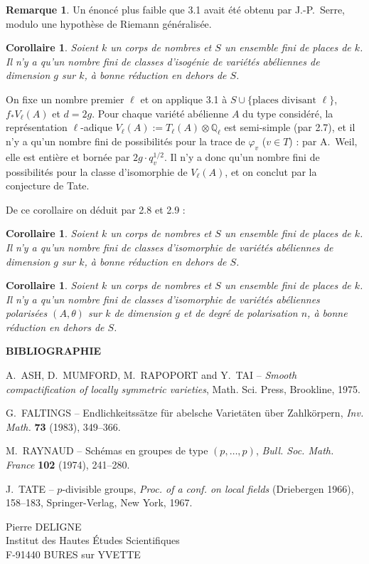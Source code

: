 \documentclass[12pt,a4paper]{article}
\theoremstyle{plain}
\newtheorem{corollary}[theorem]{Corollaire}
\theoremstyle{definition}
\newtheorem{remark}[theorem]{Remarque}
\theoremstyle{remark}
\newcommand{\QQ}{\mathbb{Q}}
\providecommand{\QQ}{\mathbb{Q}}
\begin{document}
\begin{remark}
Un énoncé plus faible que 3.1 avait été obtenu par J.-P.~Serre, modulo une hypothèse de Riemann généralisée.
\end{remark}

\begin{corollary}
Soient $k$ un corps de nombres et $S$ un ensemble fini de places de $k$. Il n'y a qu'un nombre fini de classes d'isogénie de variétés abéliennes de dimension $g$ sur $k$, à bonne réduction en dehors de $S$.
\end{corollary}

On fixe un nombre premier $\ell$ et on applique 3.1 à $S \cup \{\text{places divisant } \ell\}$, $f_* V_\ell(A)$ et $d = 2g$. Pour chaque variété abélienne $A$ du type considéré, la représentation $\ell$-adique $V_\ell(A) := T_\ell(A) \otimes \QQ_\ell$ est semi-simple (par 2.7), et il n'y a qu'un nombre fini de possibilités pour la trace de $\varphi_v$ ($v \in T$) : par A.~Weil, elle est entière et bornée par $2g \cdot q_v^{1/2}$. Il n'y a donc qu'un nombre fini de possibilités pour la classe d'isomorphie de $V_\ell(A)$, et on conclut par la conjecture de Tate.

De ce corollaire on déduit par 2.8 et 2.9 :

\begin{corollary}
Soient $k$ un corps de nombres et $S$ un ensemble fini de places de $k$. Il n'y a qu'un nombre fini de classes d'isomorphie de variétés abéliennes de dimension $g$ sur $k$, à bonne réduction en dehors de $S$.
\end{corollary}

\begin{corollary}
Soient $k$ un corps de nombres et $S$ un ensemble fini de places de $k$. Il n'y a qu'un nombre fini de classes d'isomorphie de variétés abéliennes polarisées $(A,\theta)$ sur $k$ de dimension $g$ et de degré de polarisation $n$, à bonne réduction en dehors de $S$.
\end{corollary}

\vspace{12pt}
\noindent\textbf{BIBLIOGRAPHIE}
\begin{enumerate}[label={[\arabic*]},leftmargin=2em,itemsep=0pt]
\item A.~ASH, D.~MUMFORD, M.~RAPOPORT and Y.~TAI -- \textit{Smooth compactification of locally symmetric varieties}, Math. Sci. Press, Brookline, 1975.
\item G.~FALTINGS -- Endlichkeitssätze für abelsche Varietäten über Zahlkörpern, \textit{Inv. Math.} \textbf{73} (1983), 349--366.
\item M.~RAYNAUD -- Schémas en groupes de type $(p,\ldots,p)$, \textit{Bull. Soc. Math. France} \textbf{102} (1974), 241--280.
\item J.~TATE -- $p$-divisible groups, \textit{Proc. of a conf. on local fields} (Driebergen 1966), 158--183, Springer-Verlag, New York, 1967.
\end{enumerate}

\vspace{24pt}
\noindent Pierre DELIGNE\\
Institut des Hautes Études Scientifiques\\
F-91440 BURES sur YVETTE
\end{document}
